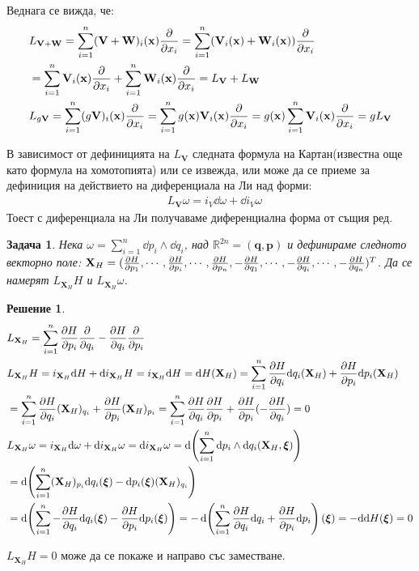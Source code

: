 \documentclass[12pt]{article}
\newtheorem{problem}{Задача}
\newtheorem*{solution*}{Решение}
\newcommand\myxi[0]{\boldsymbol{\xi}}
\begin{document}
\begin{large}
Веднага се вижда, че:
\begin{align*}
  &L_{\mathbf{V}+\mathbf{W}}= \sum_{i=1}^{n}(\mathbf{V}+\mathbf{W})_i(\mathbf{x})\pdv{}{x_i} = \sum_{i=1}^{n}(\mathbf{V}_i(\mathbf{x})+\mathbf{W}_i(\mathbf{x}))\pdv{}{x_i} \\
  &=\sum_{i=1}^{n}\mathbf{V}_i(\mathbf{x})\pdv{}{x_i}+\sum_{i=1}^{n}\mathbf{W}_i(\mathbf{x})\pdv{}{x_i} = L_{\mathbf{V}} + L_{\mathbf{W}} \\
  &L_{g\mathbf{V}}= \sum_{i=1}^{n}(g\mathbf{V})_i(\mathbf{x})\pdv{}{x_i} = \sum_{i=1}^{n}g(\mathbf{x})\mathbf{V}_i(\mathbf{x})\pdv{}{x_i} = g(\mathbf{x})\sum_{i=1}^{n}\mathbf{V}_i(\mathbf{x})\pdv{}{x_i} = g L_{\mathbf{V}} \\
\end{align*}

В зависимост от дефиницията на $L_\mathbf{V}$ следната формула на Картан(известна още като формула на хомотопията) или се извежда, или може да се приеме за дефиниция на действието на диференциала на Ли над форми:
\begin{align*}
  &L_\mathbf{V}\omega=i_V \dd \omega + \dd i_V \omega
\end{align*}
Тоест с диференциала на Ли получаваме диференциална форма от същия ред.

\begin{problem}
  Нека $\omega = \sum_{i=1}^n \dd p_i \wedge \dd q_i$, над $\mathbb{R}^{2n}=(\mathbf{q},\mathbf{p})$ и дефинираме следното векторно поле: $\mathbf{X}_H=(\pdv{H}{p_1},\cdots,\pdv{H}{p_i},\cdots,\pdv{H}{p_n},-\pdv{H}{q_1},\cdots,-\pdv{H}{q_i},\cdots,-\pdv{H}{q_n})^T$. Да се намерят $L_{\mathbf{X}_H}H$ и $L_{\mathbf{X}_H}\omega$.
\end{problem}

\begin{solution*}
  \begin{align*}
    &L_{\mathbf{X}_H}=\sum_{i=1}^n \pdv{H}{p_i}\pdv{}{q_i}-\pdv{H}{q_i}\pdv{}{p_i} \\
    &L_{\mathbf{X}_H} H = i_{\mathbf{X}_H} \dd H + \dd i_{\mathbf{X}_H} H = i_{\mathbf{X}_H} \dd H = \dd H(\mathbf{X}_H) = \sum_{i=1}^n \pdv{H}{q_i} \dd q_i(\mathbf{X}_H) + \pdv{H}{p_i} \dd p_i(\mathbf{X}_H) \\
    &=\sum_{i=1}^n \pdv{H}{q_i} (\mathbf{X}_H)_{q_i} + \pdv{H}{p_i}  (\mathbf{X}_H)_{p_i} = \sum_{i=1}^n \pdv{H}{q_i} \pdv{H}{p_i} + \pdv{H}{p_i} (-\pdv{H}{q_i}) = 0 \\
    &L_{\mathbf{X}_H} \omega = i_{\mathbf{X}_H} \dd \omega + \dd i_{\mathbf{X}_H} \omega = \dd i_{\mathbf{X}_H} \omega = \dd (\sum_{i=1}^n \dd p_i \wedge \dd q_i (\mathbf{X}_H,\myxi)) \\
    &= \dd (\sum_{i=1}^n (\mathbf{X}_H)_{p_i} \dd q_i(\myxi) - \dd p_i(\myxi) (\mathbf{X}_H)_{q_i} )  \\
    &=\dd(\sum_{i=1}^n -\pdv{H}{q_i} \dd q_i(\myxi) - \pdv{H}{p_i} \dd p_i(\myxi)) = - \dd(\sum_{i=1}^n \pdv{H}{q_i} \dd q_i + \pdv{H}{p_i} \dd p_i)(\myxi) = - \dd \dd H (\myxi) = 0
  \end{align*}
\end{solution*}
$L_{\mathbf{X}_H} H = 0$ може да се покаже и направо със заместване.


\end{large}
\end{document}
